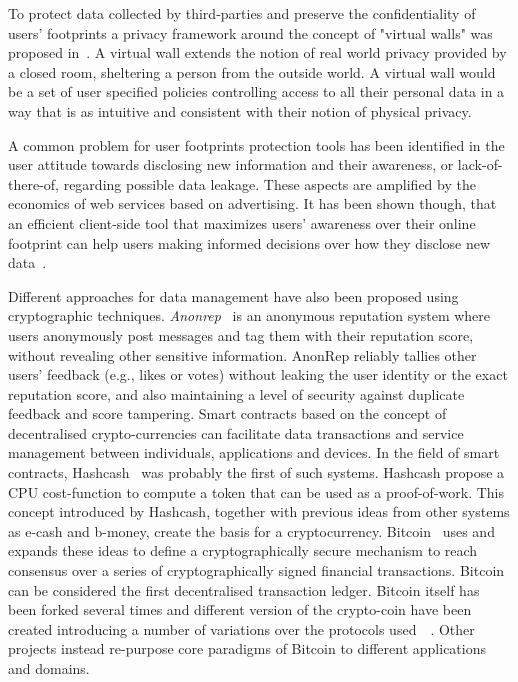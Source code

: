 To protect data collected by third-parties and preserve the confidentiality of users' footprints a privacy framework around the concept of "virtual walls" was proposed in~\cite{kapadia2007virtual}. A virtual wall extends the notion of real world privacy provided by a closed room, sheltering a person from the outside world. A virtual wall would be a set of user specified policies controlling access to all their personal data
in a way that is as intuitive and consistent with their notion of physical privacy.

A common problem for user footprints protection tools has been identified in the user attitude towards disclosing new information and their awareness, or lack-of-there-of, regarding possible data leakage. These aspects are amplified by the economics of web services based on advertising. It has been shown though, that an efficient client-side tool that maximizes users' awareness over their online footprint can help users making informed decisions
over how they disclose new data~\cite{malandrino2013privacy}.

Different approaches for data management have also been proposed using cryptographic techniques. \emph{Anonrep}~\cite{zhai2016anonrep} is an anonymous reputation system where users anonymously post messages and tag them with their reputation score, without revealing other sensitive information. AnonRep reliably tallies other users' feedback (e.g., likes or votes) without leaking the user identity or the exact reputation score, and also maintaining a level of security against duplicate feedback and score tampering. Smart contracts based on the concept of decentralised crypto-currencies can facilitate data transactions and service management between individuals, applications and devices. In the field of smart contracts, Hashcash~\cite{back2002hashcash, back2002hashcash2} was probably the first of such systems. Hashcash propose a CPU cost-function to compute a token that can be used as a proof-of-work. This concept introduced by Hashcash, together with previous ideas from other systems as e-cash and b-money, create the basis for a cryptocurrency. Bitcoin~\cite{nakamoto2008bitcoin} uses and expands these ideas to define a cryptographically secure mechanism to reach consensus over a series of cryptographically signed financial transactions. Bitcoin can be considered the first decentralised transaction ledger. Bitcoin itself has been forked several times and different version of the crypto-coin have been created introducing a number of variations over the protocols used~\cite{tschorsch2015bitcoin}~\cite{sprankel2013technical}. Other projects instead re-purpose core paradigms of Bitcoin to different applications and domains.

